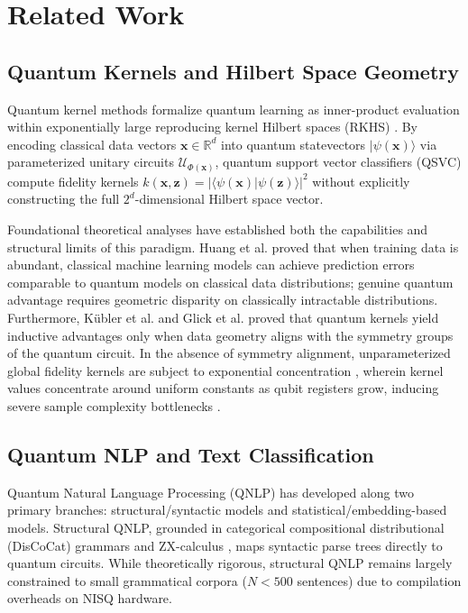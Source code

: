 \documentclass[10pt,twocolumn,letterpaper]{article}
\begin{document}
\section{Related Work}
\label{sec:related}

\subsection{Quantum Kernels and Hilbert Space Geometry}
Quantum kernel methods formalize quantum learning as inner-product evaluation within exponentially large reproducing kernel Hilbert spaces (RKHS) \cite{havlicek2019supervised,schuld2019quantum}. By encoding classical data vectors $\mathbf{x} \in \mathbb{R}^d$ into quantum statevectors $|\psi(\mathbf{x})\rangle$ via parameterized unitary circuits $\mathcal{U}_{\Phi(\mathbf{x})}$, quantum support vector classifiers (QSVC) compute fidelity kernels $k(\mathbf{x}, \mathbf{z}) = |\langle\psi(\mathbf{x})|\psi(\mathbf{z})\rangle|^2$ without explicitly constructing the full $2^d$-dimensional Hilbert space vector.

Foundational theoretical analyses have established both the capabilities and structural limits of this paradigm. Huang et al. \cite{huang2021power} proved that when training data is abundant, classical machine learning models can achieve prediction errors comparable to quantum models on classical data distributions; genuine quantum advantage requires geometric disparity on classically intractable distributions. Furthermore, Kübler et al. \cite{kubler2021inductive} and Glick et al. \cite{glick2022covariant} proved that quantum kernels yield inductive advantages only when data geometry aligns with the symmetry groups of the quantum circuit. In the absence of symmetry alignment, unparameterized global fidelity kernels are subject to exponential concentration \cite{thanasilp2024exponential}, wherein kernel values concentrate around uniform constants as qubit registers grow, inducing severe sample complexity bottlenecks \cite{bowles2024contextuality}.

\subsection{Quantum NLP and Text Classification}
Quantum Natural Language Processing (QNLP) has developed along two primary branches: structural/syntactic models and statistical/embedding-based models. Structural QNLP, grounded in categorical compositional distributional (DisCoCat) grammars and ZX-calculus \cite{coecke2020mathematics,lorenz2021qnlp}, maps syntactic parse trees directly to quantum circuits. While theoretically rigorous, structural QNLP remains largely constrained to small grammatical corpora ($N < 500$ sentences) due to compilation overheads on NISQ hardware.
\end{document}
